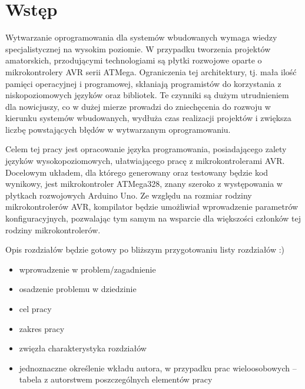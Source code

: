 \chapter{Wstęp}
\label{ch:wstep}

Wytwarzanie oprogramowania dla systemów wbudowanych wymaga wiedzy specjalistycznej na wysokim poziomie. W przypadku tworzenia projektów amatorskich, przodującymi technologiami są płytki rozwojowe oparte o mikrokontrolery AVR serii ATMega. Ograniczenia tej architektury, tj. mała ilość pamięci operacyjnej i programowej, skłaniają programistów do korzystania z niskopoziomowych języków oraz bibliotek. Te czynniki są dużym utrudnieniem dla nowicjuszy, co w dużej mierze prowadzi do zniechęcenia do rozwoju w kierunku systemów wbudowanych, wydłuża czas realizacji projektów i zwiększa liczbę powstających błędów w wytwarzanym oprogramowaniu.

Celem tej pracy jest opracowanie języka programowania, posiadającego zalety języków wysokopoziomowych, ułatwiającego pracę z mikrokontrolerami AVR. Docelowym układem, dla którego generowany oraz testowany będzie kod wynikowy, jest mikrokontroler ATMega328, znany szeroko z występowania w płytkach rozwojowych Arduino Uno. Ze względu na rozmiar rodziny mikrokontrolerów AVR, kompilator będzie umożliwiał wprowadzenie parametrów konfiguracyjnych, pozwalając tym samym na wsparcie dla większości członków tej rodziny mikrokontrolerów. 

Opis rozdziałów będzie gotowy po bliższym przygotowaniu listy rozdziałów :)

\begin{itemize}
\item wprowadzenie w problem/zagadnienie
\item osadzenie problemu w dziedzinie
\item cel pracy
\item zakres pracy
\item zwięzła charakterystyka rozdziałów
\item jednoznaczne określenie wkładu autora, w przypadku prac wieloosobowych – tabela z autorstwem poszczególnych elementów pracy
\end{itemize}